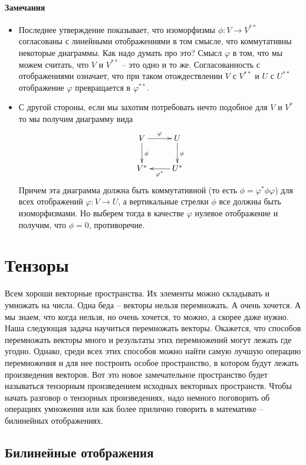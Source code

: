 \paragraph{Замечания}
\begin{itemize}
\item Последнее утверждение показывает, что изоморфизмы $\phi\colon V\to V^{**}$ согласованы с линейными отображениями в том смысле, что коммутативны некоторые диаграммы. Как надо думать про это? Смысл $\varphi$ в том, что мы можем считать, что $V$ и $V^{**}$ -- это одно и то же. Согласованность с отображениями означает, что при таком отождествлении $V$ с $V^{**}$ и $U$ с $U^{**}$ отображение $\varphi$ превращается в $\varphi^{**}$.

\item С другой стороны, если мы захотим потребовать нечто подобное для $V$ и $V^*$ то мы получим диаграмму вида
\[
\xymatrix{
	{V}\ar[r]^{\varphi}\ar[d]^{\phi}&{U}\ar[d]^{\phi}\\
	{V^*}&{U^*}\ar[l]^{\varphi^*}
}
\]
Причем эта диаграмма должна быть коммутативной (то есть $\phi = \varphi^*\phi\varphi$) для всех отображений $\varphi\colon V\to U$, а вертикальные стрелки $\phi$ все должны быть изоморфизмами. Но выберем тогда в качестве $\varphi$ нулевое отображение и получим, что $\phi = 0$, противоречие.
\end{itemize}


\newpage
\section{Тензоры}

Всем хороши векторные пространства. Их элементы можно складывать и умножать на числа. Одна беда -- векторы нельзя перемножать. А очень хочется. А мы знаем, что когда нельзя, но очень хочется, то можно, а скорее даже нужно. Наша следующая задача научиться перемножать векторы. Окажется, что способов перемножать векторы много и результаты этих перемножений могут лежать где угодно. Однако, среди всех этих способов можно найти самую лучшую операцию перемножения и для нее построить особое пространство, в котором будут лежать произведения векторов. Вот это новое замечательное пространство будет называться тензорным произведением исходных векторных пространств. Чтобы начать разговор о тензорных произведениях, надо немного поговорить об операциях умножения или как более прилично говорить в математике -- билинейных отображениях.

\subsection{Билинейные отображения}

